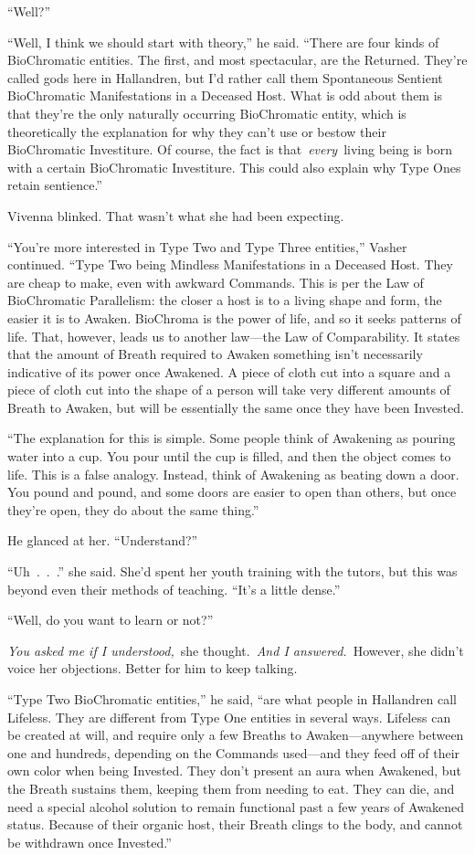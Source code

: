“Well?”

“Well, I think we should start with theory,” he said. “There are four kinds of BioChromatic entities. The first, and most spectacular, are the Returned. They’re called gods here in Hallandren, but I’d rather call them Spontaneous Sentient BioChromatic Manifestations in a Deceased Host. What is odd about them is that they’re the only naturally occurring BioChromatic entity, which is theoretically the explanation for why they can’t use or bestow their BioChromatic Investiture. Of course, the fact is that~\textit{every}~living being is born with a certain BioChromatic Investiture. This could also explain why Type Ones retain sentience.”

Vivenna blinked. That wasn’t what she had been expecting.

“You’re more interested in Type Two and Type Three entities,” Vasher continued. “Type Two being Mindless Manifestations in a Deceased Host. They are cheap to make, even with awkward Commands. This is per the Law of BioChromatic Parallelism: the closer a host is to a living shape and form, the easier it is to Awaken. BioChroma is the power of life, and so it seeks patterns of life. That, however, leads us to another law—the Law of Comparability. It states that the amount of Breath required to Awaken something isn’t necessarily indicative of its power once Awakened. A piece of cloth cut into a square and a piece of cloth cut into the shape of a person will take very different amounts of Breath to Awaken, but will be essentially the same once they have been Invested.

“The explanation for this is simple. Some people think of Awakening as pouring water into a cup. You pour until the cup is filled, and then the object comes to life. This is a false analogy. Instead, think of Awakening as beating down a door. You pound and pound, and some doors are easier to open than others, but once they’re open, they do about the same thing.”

He glanced at her. “Understand?”

“Uh~.~.~.” she said. She’d spent her youth training with the tutors, but this was beyond even their methods of teaching. “It’s a little dense.”

“Well, do you want to learn or not?”

\textit{You asked me if I understood,}~she thought.~\textit{And I answered.}~However, she didn’t voice her objections. Better for him to keep talking.

“Type Two BioChromatic entities,” he said, “are what people in Hallandren call Lifeless. They are different from Type One entities in several ways. Lifeless can be created at will, and require only a few Breaths to Awaken—anywhere between one and hundreds, depending on the Commands used—and they feed off of their own color when being Invested. They don’t present an aura when Awakened, but the Breath sustains them, keeping them from needing to eat. They can die, and need a special alcohol solution to remain functional past a few years of Awakened status. Because of their organic host, their Breath clings to the body, and cannot be withdrawn once Invested.”


